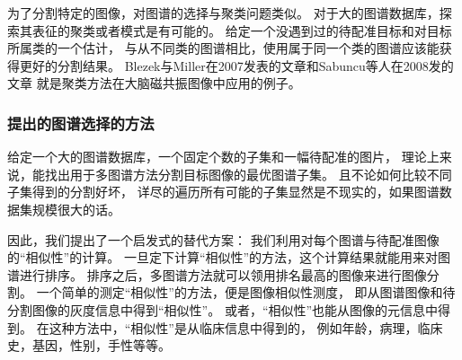 为了分割特定的图像，对图谱的选择与聚类问题类似。
对于大的图谱数据库，探索其表征的聚类或者模式是有可能的。
给定一个没遇到过的待配准目标和对目标所属类的一个估计，
与从不同类的图谱相比，使用属于同一个类的图谱应该能获得更好的分割结果。
Blezek与Miller在2007发表的文章和Sabuncu等人在2008发的文章
就是聚类方法在大脑磁共振图像中应用的例子。

\subsubsection*{提出的图谱选择的方法}
给定一个大的图谱数据库，一个固定个数的子集和一幅待配准的图片，
理论上来说，能找出用于多图谱方法分割目标图像的最优图谱子集。
且不论如何比较不同子集得到的分割好坏，
详尽的遍历所有可能的子集显然是不现实的，如果图谱数据集规模很大的话。

因此，我们提出了一个启发式的替代方案：
我们利用对每个图谱与待配准图像的``相似性''的计算。
一旦定下计算``相似性''的方法，这个计算结果就能用来对图谱进行排序。
排序之后，多图谱方法就可以领用排名最高的图像来进行图像分割。
一个简单的测定``相似性''的方法，便是图像相似性测度，
即从图谱图像和待分割图像的灰度信息中得到``相似性''。
或者，``相似性''也能从图像的元信息中得到。
在这种方法中，``相似性''是从临床信息中得到的，
例如年龄，病理，临床史，基因，性别，手性等等。


